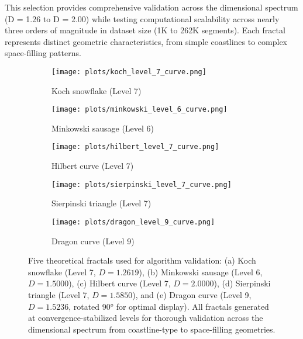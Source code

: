 \documentclass[preprint,12pt]{elsarticle}
\begin{document}
This selection provides comprehensive validation across the dimensional spectrum (D = 1.26 to D = 2.00) while testing computational scalability across nearly three orders of magnitude in dataset size (1K to 262K segments). Each fractal represents distinct geometric characteristics, from simple coastlines to complex space-filling patterns.

\begin{figure}[H]
\centering
\vspace{-0.5cm}
\begin{subfigure}[b]{0.45\textwidth}
    \centering
    \texttt{[image: plots/koch\_level\_7\_curve.png]}
    \caption{Koch snowflake (Level 7)}
    \label{fig:koch_fractal}
\end{subfigure}
\hfill
\begin{subfigure}[b]{0.45\textwidth}
    \centering
    \texttt{[image: plots/minkowski\_level\_6\_curve.png]}
    \caption{Minkowski sausage (Level 6)}
    \label{fig:minkowski_fractal}
\end{subfigure}
\vspace{0.3cm}
\begin{subfigure}[b]{0.45\textwidth}
    \centering
    \texttt{[image: plots/hilbert\_level\_7\_curve.png]}
    \caption{Hilbert curve (Level 7)}
    \label{fig:hilbert_fractal}
\end{subfigure}
\hfill
\begin{subfigure}[b]{0.45\textwidth}
    \centering
    \texttt{[image: plots/sierpinski\_level\_7\_curve.png]}
    \caption{Sierpinski triangle (Level 7)}
    \label{fig:sierpinski_fractal}
\end{subfigure}
\vspace{0.3cm}
\begin{subfigure}[b]{0.45\textwidth}
    \centering
    \texttt{[image: plots/dragon\_level\_9\_curve.png]}
    \caption{Dragon curve (Level 9)}
    \label{fig:dragon_fractal}
\end{subfigure}

\vspace{0.3cm}

\vspace{-0.3cm}
\caption{\small Five theoretical fractals used for algorithm validation: (a) Koch snowflake (Level 7, $D = 1.2619$), (b) Minkowski sausage (Level 6, $D = 1.5000$), (c) Hilbert curve (Level 7, $D = 2.0000$), (d) Sierpinski triangle (Level 7, $D = 1.5850$), and (e) Dragon curve (Level 9, $D = 1.5236$, rotated 90° for optimal display). All fractals generated at convergence-stabilized levels for thorough validation across the dimensional spectrum from coastline-type to space-filling geometries.}
\label{fig:five_fractals}
\vspace{-0.5cm}
\end{figure}
\end{document}
